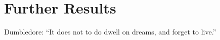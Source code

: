 \chapter{Further Results}
\label{c:further-result}

Dumbledore: ``It does not to do dwell on dreams, and forget to live.''

